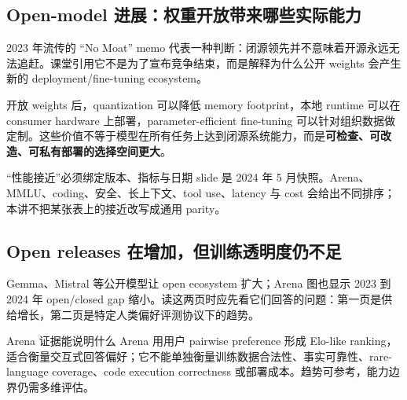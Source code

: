 \subsection{Open-model 进展：权重开放带来哪些实际能力}

2023 年流传的 ``No Moat'' memo 代表一种判断：闭源领先并不意味着开源永远无法追赶。课堂引用它不是为了宣布竞争结束，而是解释为什么公开 weights 会产生新的 deployment/fine-tuning ecosystem。


开放 weights 后，quantization 可以降低 memory footprint，本地 runtime 可以在 consumer hardware 上部署，parameter-efficient fine-tuning 可以针对组织数据做定制。这些价值不等于模型在所有任务上达到闭源系统能力，而是\textbf{可检查、可改造、可私有部署的选择空间更大}。


\begin{warningbox}{“性能接近”必须绑定版本、指标与日期}
slide 是 2024 年 5 月快照。Arena、MMLU、coding、安全、长上下文、tool use、latency 与 cost 会给出不同排序；本讲不把某张表上的接近改写成通用 parity。
\end{warningbox}


\subsection{Open releases 在增加，但训练透明度仍不足}

Gemma、Mistral 等公开模型让 open ecosystem 扩大；Arena 图也显示 2023 到 2024 年 open/closed gap 缩小。读这两页时应先看它们回答的问题：第一页是供给增长，第二页是特定人类偏好评测协议下的趋势。



\begin{knowledgebox}{Arena 证据能说明什么}
Arena 用用户 pairwise preference 形成 Elo-like ranking，适合衡量交互式回答偏好；它不能单独衡量训练数据合法性、事实可靠性、rare-language coverage、code execution correctness 或部署成本。趋势可参考，能力边界仍需多维评估。
\end{knowledgebox}

